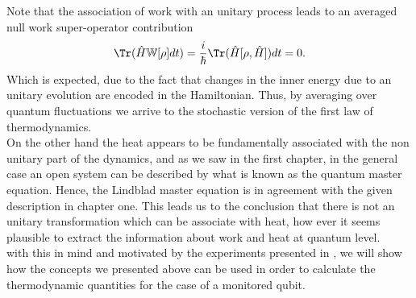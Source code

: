 Note that the association of work with an unitary process leads to an averaged null work super-operator contribution
\begin{equation}
\Tr(\hat{H}\mathbb{W}[\rho]dt)=\frac{i}{\hbar}\Tr(\hat{H}[\rho,\hat{H}])dt=0.
\end{equation}
Which is expected, due to the fact that changes in the inner energy due to an unitary evolution are encoded in the Hamiltonian. Thus, by averaging over quantum fluctuations we arrive to the stochastic version of the first law of thermodynamics.\\
On the other hand the heat appears to be fundamentally associated with the non unitary part of the dynamics, and as we saw in the first chapter, in the general case an open system can be described by what is known as the quantum master equation. Hence, the Lindblad master equation is in agreement with the given description in chapter one. This leads us to the conclusion that there is not an unitary transformation which can be associate with heat, how ever it seems plausible to extract the information about work and heat at quantum level.\\
with this in mind and motivated by the experiments presented in \cite{experiment1,experiment2}, we will show how the concepts we presented above can be used in order to calculate the thermodynamic quantities for the case of a monitored  qubit.
